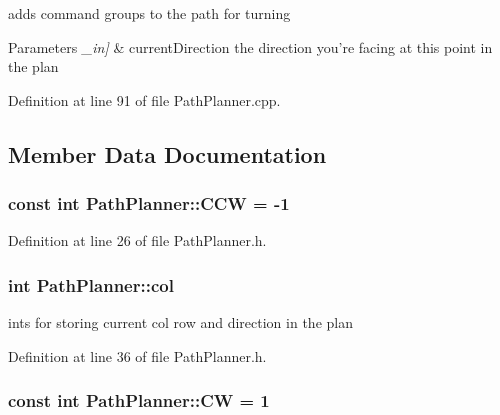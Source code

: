 adds command groups to the path for turning 


\begin{DoxyParams}{Parameters}
{\em \-\_\-in\mbox{]}} & current\-Direction the direction you're facing at this point in the plan \\
\hline
\end{DoxyParams}


Definition at line 91 of file Path\-Planner.\-cpp.



\subsection{Member Data Documentation}
\hypertarget{classPathPlanner_ab08a4cb0f762a4401a804bf0ce1bbbe6}{
\subsubsection[{C\-C\-W}]{\setlength{\rightskip}{0pt plus 5cm}const int Path\-Planner\-::\-C\-C\-W = -\/1\hspace{0.3cm}{\ttfamily [static]}}}\label{classPathPlanner_ab08a4cb0f762a4401a804bf0ce1bbbe6}


Definition at line 26 of file Path\-Planner.\-h.

\hypertarget{classPathPlanner_a20d2bf800c63aacfd1af314ad400d119}{
\subsubsection[{col}]{\setlength{\rightskip}{0pt plus 5cm}int Path\-Planner\-::col\hspace{0.3cm}{\ttfamily [private]}}}\label{classPathPlanner_a20d2bf800c63aacfd1af314ad400d119}


ints for storing current col row and direction in the plan 



Definition at line 36 of file Path\-Planner.\-h.

\hypertarget{classPathPlanner_af08949a4cd572b26f4f37ff441191b3a}{
\subsubsection[{C\-W}]{\setlength{\rightskip}{0pt plus 5cm}const int Path\-Planner\-::\-C\-W = 1\hspace{0.3cm}{\ttfamily [static]}}}\label{classPathPlanner_af08949a4cd572b26f4f37ff441191b3a}


